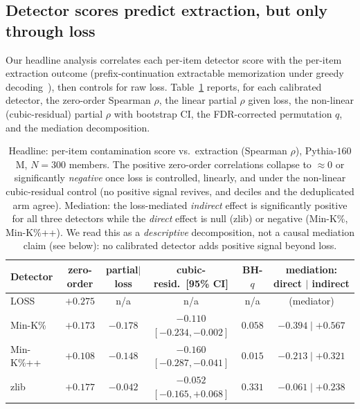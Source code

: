 \subsection{Detector scores predict extraction, but only through loss}
\label{sec:res-headline}
Our headline analysis correlates each per-item detector score with the per-item extraction outcome
(prefix-continuation extractable memorization under greedy decoding~\citep{carlini2023quantifying}),
then controls for raw loss. Table~\ref{tab:headline} reports, for each calibrated detector, the
zero-order Spearman $\rho$, the linear partial $\rho$ given loss, the non-linear (cubic-residual)
partial $\rho$ with bootstrap CI, the FDR-corrected permutation $q$, and the mediation decomposition.

\begin{table}[t]
\centering\footnotesize\setlength{\tabcolsep}{3.5pt}
\begin{tabular}{@{}lccccc@{}}
\toprule
Detector & zero-order & partial$\mid$loss & cubic-resid.\ [95\% CI] & BH-$q$ & mediation: direct $\mid$ indirect \\
\midrule
LOSS & $+0.275$ & n/a & n/a & n/a & (mediator) \\
Min-K\% & $+0.173$ & $-0.178$ & $-0.110$ $[-0.234,-0.002]$ & $0.058$ & $-0.394 \mid +0.567$ \\
Min-K\%++ & $+0.108$ & $-0.148$ & $-0.160$ $[-0.287,-0.041]$ & $\mathbf{0.015}$ & $-0.213 \mid +0.321$ \\
zlib & $+0.177$ & $-0.042$ & $-0.052$ $[-0.165,+0.068]$ & $0.331$ & $-0.061 \mid +0.238$ \\
\bottomrule
\end{tabular}
\caption{Headline: per-item contamination score vs.\ extraction (Spearman $\rho$), Pythia-$160$M,
$N=300$ members. The positive zero-order correlations collapse to $\approx 0$ or significantly
\emph{negative} once loss is controlled, linearly, and under the non-linear cubic-residual control
(no positive signal revives, and deciles and the deduplicated arm agree). Mediation: the loss-mediated
\emph{indirect} effect is significantly positive for all three detectors while the \emph{direct}
effect is null (zlib) or negative (Min-K\%, Min-K\%++). We read this as a \emph{descriptive}
decomposition, not a causal mediation claim (see below): no calibrated detector adds positive signal
beyond loss.}
\label{tab:headline}
\end{table}

